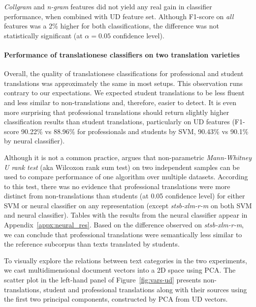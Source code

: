 \textit{Collgram} and \textit{n-gram} features did not yield any real gain in classifier performance, when combined with UD feature set. Although F1-score on \textit{all} features was a 2\% higher for both classifications, the difference was not statistically significant (at $\alpha=0.05$ confidence level).


\paragraph{Performance of translationese classifiers on two translation varieties}
Overall, the quality of translationese classifications for professional and student translations was approximately the same in most setups. This observation runs contrary to our expectations. We expected student translations to be less fluent and less similar to non-translations and, therefore, easier to detect. 
It is even more surprising that professional translations should return slightly higher classification results than student translations, particularly on UD features (F1-score 90.22\% vs 88.96\% for professionals and students by SVM, 90.43\% vs 90.1\% by neural classifier).

Although it is not a common practice, \citet{Demvsar2006} argues that non-parametric \textit{Mann-Whitney U rank test} (aka Wilcoxon rank sum test) on two independent samples can be used to compare performance of one algorithm over multiple datasets. 
According to this test, there was no evidence that professional translations were more distinct from non-translations than students (at 0.05 confidence level) for either SVM or neural classifier on any representation (except \textit{stsb-xlm-r-m} on both SVM and neural classifier). Tables with the results from the neural classifier appear in Appendix~\ref{appx:neural_res}.
Based on the difference observed on \textit{stsb-xlm-r-m}, we can conclude that professional translations were semantically less similar to the reference subcorpus than texts translated by students. 

To visually explore the relations between text categories in the two experiments, we cast multidimensional document vectors into a 2D space using PCA. 
The scatter plot in the left-hand panel of Figure~\ref{fig:vars-ud} presents non-translations, student and professional translations along with their sources using the first two principal components, constructed by PCA from UD vectors.

